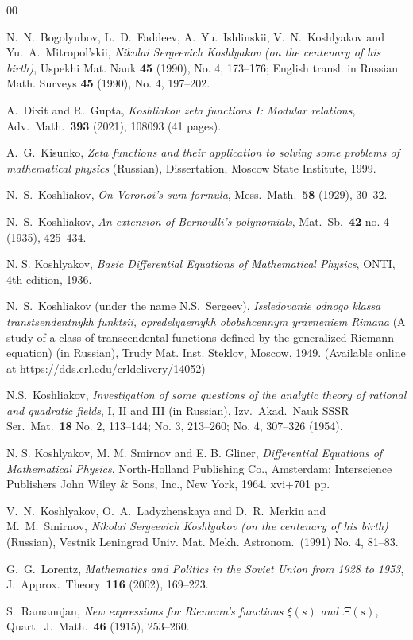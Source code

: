 \documentclass[12pt,reqno]{amsart}
\renewcommand{\(}{\left\(}
\renewcommand{\)}{\right\)}
\renewcommand{\[}{\left\[}
\renewcommand{\]}{\right\]}
\numberwithin{equation}{section}
\theoremstyle{plain}
\begin{document}
\begin{thebibliography}{00}

N.~N.~Bogolyubov, L.~D.~Faddeev, A.~Yu.~Ishlinskii, V.~N.~Koshlyakov and Yu.~A.~Mitropol'skii, \emph{Nikolai Sergeevich Koshlyakov (on the centenary of his birth)}, Uspekhi Mat. Nauk \textbf{45} (1990), No. 4, 173--176; English transl. in Russian Math. Surveys \textbf{45} (1990), No. 4, 197--202.

A.~Dixit and R.~Gupta, \emph{Koshliakov zeta functions I: Modular relations}, Adv.~Math.~\textbf{393} (2021), 108093 (41 pages). 

A.~G.~Kisunko, \emph{Zeta functions and their application to solving some problems of mathematical physics} (Russian), Dissertation, Moscow State Institute, 1999.

N.~S.~Koshliakov, \emph{On Voronoi's sum-formula},
Mess.~Math.~\textbf{58} (1929), 30--32.

N.~S.~Koshliakov, \emph{An extension of Bernoulli's polynomials}, Mat.~Sb.~\textbf{42} no. 4 (1935), 425--434.

N. S. Koshlyakov, \emph{Basic Differential Equations of Mathematical Physics}, ONTI, 4th edition, 1936.

N.~S.~Koshliakov (under the name N.S.~Sergeev), \emph{Issledovanie odnogo klassa transtsendentnykh
	funktsii, opredelyaemykh obobshcennym yravneniem Rimana} (A study of a
class of transcendental functions defined by the generalized
Riemann equation) (in Russian), Trudy Mat. Inst. Steklov, Moscow,
1949. (Available online at \url{https://dds.crl.edu/crldelivery/14052})

N.S.~Koshliakov, \emph{Investigation of some questions of the
	analytic theory of rational and quadratic fields}, I, II and III (in
Russian), Izv.~Akad.~Nauk SSSR Ser.~Mat.~\textbf{18} No. 2, 113--144; No. 3, 213--260; No. 4, 307--326 (1954).

N. S. Koshlyakov, M. M. Smirnov and E. B. Gliner, \emph{Differential Equations of Mathematical Physics}, North-Holland Publishing Co., Amsterdam; Interscience Publishers John Wiley \& Sons, Inc., New York, 1964. xvi+701 pp. 

V.~N.~Koshlyakov, O.~A.~Ladyzhenskaya and D.~R.~Merkin and M.~M.~Smirnov, \emph{Nikolai Sergeevich Koshlyakov (on the centenary of his birth)} (Russian), Vestnik Leningrad Univ. Mat. Mekh. Astronom.~(1991) No. 4, 81--83.

G.~G.~Lorentz, \emph{Mathematics and Politics in the Soviet Union from 1928 to 1953}, J.~Approx.~Theory~\textbf{116} (2002), 169--223.

S.~Ramanujan, \emph{New expressions for Riemann's functions
	$\xi(s)$ and $\Xi(s)$}, Quart.~J.~Math.~\textbf{46} (1915),
253--260.

\end{thebibliography}
\end{document}

